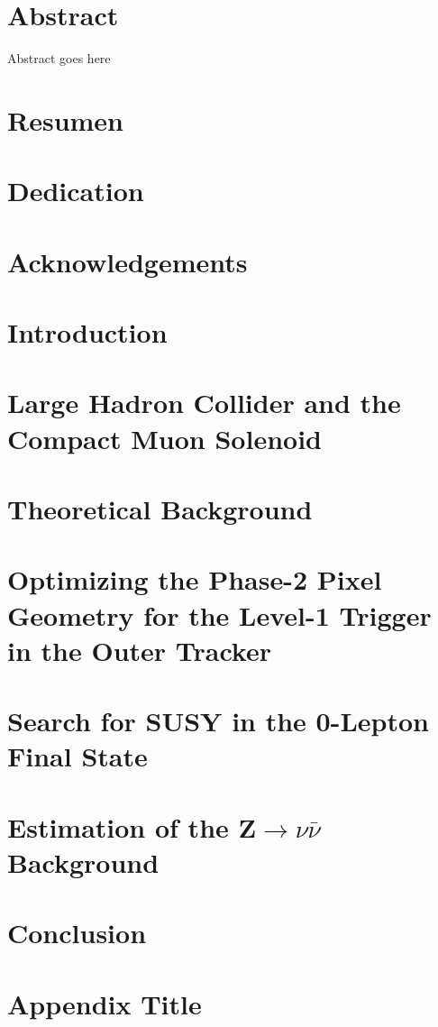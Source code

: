 \documentclass[12pt,twoside,openany]{book}
\begin{document}


\frontmatter
\chapter*{Abstract}
Abstract goes here
\chapter*{Resumen}
\chapter*{Dedication}
\chapter*{Acknowledgements}
\tableofcontents

\mainmatter
\chapter{Introduction}


\chapter{Large Hadron Collider and the Compact Muon Solenoid}\label{LHCCMS}


\chapter{Theoretical Background}\label{theory}


\chapter{Optimizing the Phase-2 Pixel Geometry for the Level-1 Trigger in the Outer Tracker}\label{stubs}


\chapter{Search for SUSY in the 0-Lepton Final State}\label{AnalysisChap}


\chapter{Estimation of the Z$\rightarrow \nu\bar{\nu}$ Background}\label{estimation}


\chapter{Conclusion}\label{conclusion}


\appendix
\chapter{Appendix Title}


{}

\end{document}
